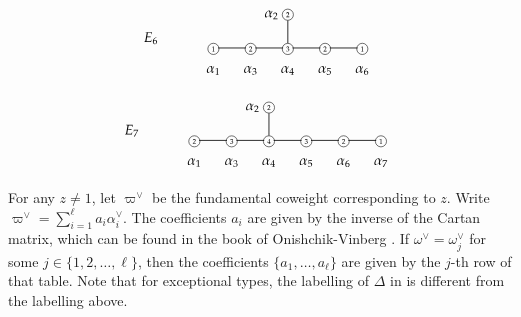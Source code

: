 \documentclass[11pt,oneside,dvipsnames]{amsart}
\theoremstyle{plain}
\theoremstyle{definition}
\theoremstyle{named}
\newcommand*\circled[1]{
  \tikz[baseline=(char.base)]\node[shape=circle,draw,inner sep=0.2pt,font=\tiny,minimum size=8pt] (char) {#1};}
\begin{document}
$$
E_6\quad\quad\quad
\begin{tikzcd}[row sep=0em, column sep=-0.1em]
&{}&& \!\!\alpha_2\!\!\!\! & \circled{2} \arrow[dd, swap, shorten=-1.5mm, dash] &{}& &{}&\\
&&&&{}&&&&\\
\circled{1} \arrow[rr, swap, shorten=-2mm, dash, yshift=-0.1mm]  && \circled{2} \arrow[rr, swap, shorten=-2mm, dash, yshift=-0.1mm] && \circled{3} \arrow[rr, swap, shorten=-2mm, dash, yshift=-0.1mm] && \circled{2} \arrow[rr, swap, shorten=-2mm, dash, yshift=-0.1mm] && \circled{1}\\
\alpha_1 && \alpha_3 && \alpha_4 && \alpha_{5} && \alpha_6
\end{tikzcd}
$$

$$
E_7\quad\quad\quad
\begin{tikzcd}[row sep=0em, column sep=-0.1em]
&{}&& \!\!\alpha_2\!\!\!\! & \circled{2} \arrow[dd, swap, shorten=-1.5mm, dash] &{}& &{}& &{}&\\
&&&&{}&&&&&&\\
\circled{2} \arrow[rr, swap, shorten=-2mm, dash, yshift=-0.1mm]  && \circled{3} \arrow[rr, swap, shorten=-2mm, dash, yshift=-0.1mm] && \circled{4} \arrow[rr, swap, shorten=-2mm, dash, yshift=-0.1mm] && \circled{3} \arrow[rr, swap, shorten=-2mm, dash, yshift=-0.1mm] && \circled{2} \arrow[rr, swap, shorten=-2mm, dash, yshift=-0.1mm] && \circled{1} \\
\alpha_1 && \alpha_3 && \alpha_4 && \alpha_{5} && \alpha_6 && \alpha_7
\end{tikzcd}
$$

For any $z\ne 1$, let $\varpi^{\vee}$ be the fundamental coweight corresponding to $z$. Write $\varpi^{\vee}=\sum_{i=1}^{\ell}a_i\alpha_i^{\vee}$. The coefficients $a_i$ are given by the inverse of the Cartan matrix, which can be found in the book of Onishchik-Vinberg \cite[Reference Chapter, \S 2, Table 2]{OV}. If $\omega^{\vee}=\omega^{\vee}_j$ for some $j\in\{1,2,\ldots,\ell\}$, then the coefficients $\{a_1,\ldots,a_{\ell}\}$ are given by the $j$-th row of that table. Note that for exceptional types, the labelling of $\Delta$ in \cite{OV} is different from the labelling above. 
\end{document}
